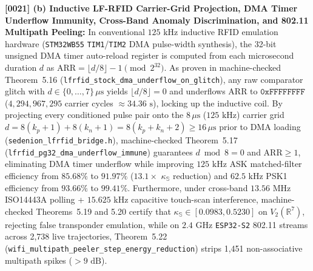 \documentclass[12pt,letterpaper]{article}
\begin{document}
\textbf{[0021] (b) Inductive LF-RFID Carrier-Grid Projection, DMA Timer Underflow Immunity, Cross-Band Anomaly Discrimination, and 802.11 Multipath Peeling:}
In conventional $125\text{ kHz}$ inductive RFID emulation hardware (\texttt{STM32WB55} \texttt{TIM1}/\texttt{TIM2} DMA pulse-width synthesis), the 32-bit unsigned DMA timer auto-reload register is computed from each microsecond duration $d$ as $\mathrm{ARR} = \lfloor d / 8 \rfloor - 1 \pmod{2^{32}}$. As proven in machine-checked Theorem~5.16 (\texttt{lfrfid\_stock\_dma\_underflow\_on\_glitch}), any raw comparator glitch with $d \in \{0,\dots,7\}\,\mu\text{s}$ yields $\lfloor d/8 \rfloor = 0$ and underflows $\mathrm{ARR}$ to $\mathtt{0xFFFFFFFF}$ ($4{,}294{,}967{,}295$ carrier cycles $\approx 34.36\text{ s}$), locking up the inductive coil. By projecting every conditioned pulse pair onto the $8\,\mu\text{s}$ ($125\text{ kHz}$) carrier grid $d = 8(k_p + 1) + 8(k_n + 1) = 8(k_p + k_n + 2) \ge 16\,\mu\text{s}$ prior to DMA loading (\texttt{sedenion\_lfrfid\_bridge.h}), machine-checked Theorem~5.17 (\texttt{lfrfid\_pg32\_dma\_underflow\_immune}) guarantees $d \bmod 8 = 0$ and $\mathrm{ARR} \ge 1$, eliminating DMA timer underflow while improving $125\text{ kHz}$ ASK matched-filter efficiency from $85.68\%$ to $91.97\%$ ($13.1\times$ $\kappa_{\mathbb{S}}$ reduction) and $62.5\text{ kHz}$ PSK1 efficiency from $93.66\%$ to $99.41\%$. Furthermore, under cross-band $13.56\text{ MHz}$ ISO14443A polling + $15.625\text{ kHz}$ capacitive touch-scan interference, machine-checked Theorems~5.19 and 5.20 certify that $\kappa_{\mathbb{S}} \in [0.0983, 0.5230]$ on $V_2(\mathbb{R}^7)$, rejecting false transponder emulation, while on $2.4\text{ GHz}$ \texttt{ESP32-S2} 802.11 streams across 2,738 live trajectories, Theorem~5.22 (\texttt{wifi\_multipath\_peeler\_step\_energy\_reduction}) strips 1,451 non-associative multipath spikes ($>9\text{ dB}$).
\end{document}
